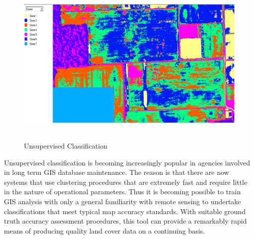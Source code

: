 \documentclass[document.tex]{subfiles}
\begin{document}
\begin{figure}[H]
	\begin{center}
		\includegraphics[height=8.0cm]{imgs/Unsupervised.png}
	\end{center}
	\caption{Unsupervised Classification}
	\label{fig: Unsupervised Classification}
\end{figure}
Unsupervised classification is becoming increasingly popular in agencies involved in
long term GIS database maintenance. The reason is that there are now systems that use
clustering procedures that are extremely fast and require little in the nature of operational parameters. Thus it is becoming possible to train GIS analysis with only a general
familiarity with remote sensing to undertake classifications that meet typical map accuracy standards. With suitable ground truth accuracy assessment procedures, this tool can provide a remarkably rapid means of producing quality land cover data on a continuing basis.
\end{document}
